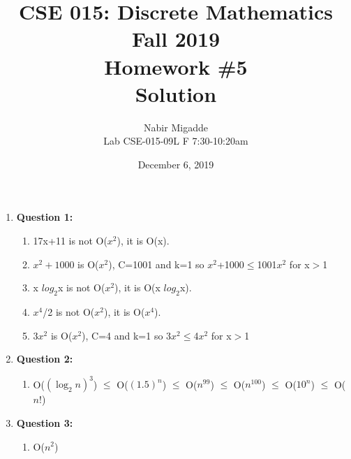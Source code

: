 \documentclass[11pt]{article}
\begin{document}
\author{Nabir Migadde\\
Lab CSE-015-09L F 7:30-10:20am}

\title{CSE 015: Discrete Mathematics\\
Fall 2019\\
Homework \#5\\
Solution}

\date{December 6, 2019}
\maketitle

\begin{enumerate}

\item
\textbf{Question 1:}

\begin{enumerate}[label=(\alph*)]
\item
 17x+11 is not O($x^2$), it is O(x).

\item
$x^2+1000$ is O($x^2$), C=1001 and k=1 so $x^2$+1000$\leq$1001$x^2$ for x$>$1

\item
x $log_2$x is not O($x^2$), it is O(x $log_2$x).

\item
 $x^4$/2 is not O($x^2$), it is O($x^4$).

\item
3$x^2$ is O($x^2$), C=4 and k=1 so 3$x^2$$\leq$4$x^2$ for x$>$1

\end{enumerate}

\item
\textbf{Question 2:}

\begin{enumerate}[label=(\alph*)]
\item
O($(\log_2 n)^3$) $\leq$ O($(1.5)^n$) $\leq$ O($n^{99}$) $\leq$ O($n^{100}$) $\leq$  O($10^n$) $\leq$ O($n!$)

\end{enumerate}

\item
\textbf{Question 3:}

\begin{enumerate}[label=(\alph*)]
\item
 O($n^2$)


\end{enumerate}
\end{enumerate}
\end{document}
